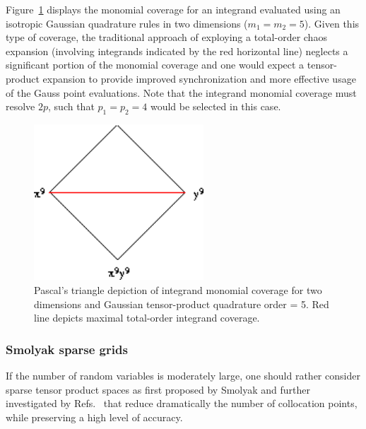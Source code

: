 Figure~\ref{fig:pascal_tensor_quad5_Gauss} displays the monomial
coverage for an integrand evaluated using an isotropic Gaussian
quadrature rules in two dimensions ($m_1 = m_2 = 5$).  Given this type
of coverage, the traditional approach of exploying a total-order chaos
expansion (involving integrands indicated by the red horizontal line)
neglects a significant portion of the monomial coverage and one would
expect a tensor-product expansion to provide improved synchronization
and more effective usage of the Gauss point evaluations.  Note that
the integrand monomial coverage must resolve $2p$, such that $p_1 =
p_2 = 4$ would be selected in this case.
\begin{figure}[h!]
\begin{center}
\includegraphics[width=2.5in]{images/TensorQuad5_Gauss}
\caption{Pascal's triangle depiction of integrand monomial coverage 
for two dimensions and Gaussian tensor-product quadrature order = 5.
Red line depicts maximal total-order integrand coverage.}
\label{fig:pascal_tensor_quad5_Gauss}
\end{center}
\end{figure}

\subsubsection{Smolyak sparse grids} \label{uq:expansion:spectral_sparse}


If the number of random variables is moderately large, one should rather
consider sparse tensor product spaces as first proposed by Smolyak
\cite{Smolyak_63} and further investigated by Refs.~\cite{gerstner_griebel_98,barth_novak_ritter_00,Fran_Schwab_Todor_04,Xiu_Hesthaven_05, webster1, webster2}
that reduce dramatically the number of collocation points, while
preserving a high level of accuracy.

